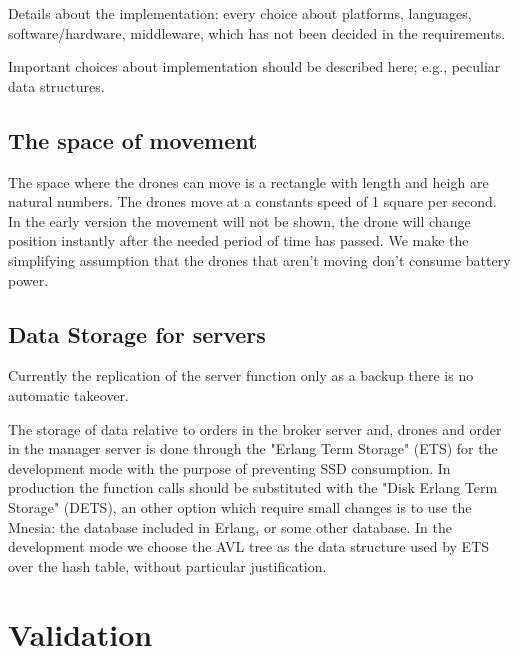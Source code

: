\documentclass[a4paper, oneside]{memoir}
\begin{document}
Details about the implementation: every choice about platforms, languages, software/hardware, middleware, which has not been decided in the requirements.


Important choices about implementation should be described here; e.g., peculiar data structures.

\section{The space of movement}
The space where the drones can move is a rectangle with length and heigh are natural numbers. The drones move at a constants speed of 1 square per second.
In the early version the movement will not be shown, the drone will change position instantly after the needed period of time has passed.
We make the simplifying assumption that the drones that aren't moving don't consume battery power.

\section{Data Storage for servers}
Currently the replication of the server function only as a backup there is no automatic takeover.

The storage of data relative to orders in the broker server and, drones and order in the manager server is done through the "Erlang Term Storage" (ETS) for the development mode with the purpose of preventing SSD consumption. In production the function calls should be substituted with the "Disk Erlang Term Storage" (DETS), an other option which require small changes is to use the Mnesia: the database included in Erlang, or some other database. In the development mode we choose the AVL tree as the data structure used by ETS over the hash table, without particular justification.

\chapter{Validation}
\end{document}
